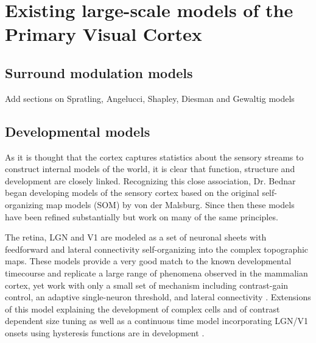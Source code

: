 \section{Existing large-scale models of the Primary Visual Cortex}

\subsection{Surround modulation models}

Add sections on Spratling, Angelucci, Shapley, Diesman and Gewaltig models

\subsection{Developmental models} \label{devmodels}

As it is thought that the cortex captures statistics about the sensory
streams to construct internal models of the world, it is clear that
function, structure and development are closely linked. Recognizing
this close association, Dr. Bednar began developing models of the
sensory cortex \citep{Bednar2003} based on the original
self-organizing map models (SOM) by von der Malsburg. Since then these
models have been refined substantially but work on many of the same
principles.

The retina, LGN and V1 are modeled as a set of neuronal sheets with
feedforward and lateral connectivity self-organizing into the complex
topographic maps. These models provide a very good match to the known
developmental timecourse and replicate a large range of phenomena
observed in the mammalian cortex, yet work with only a small set of
mechanism including contrast-gain control, an adaptive single-neuron
threshold, and lateral connectivity \citep{Stevens2013}. Extensions of
this model explaining the development of complex cells and of contrast
dependent size tuning \citep{Antolik2011} as well as a continuous time
model incorporating LGN/V1 onsets using hysteresis functions are in
development \citep{Stevens2011}.

